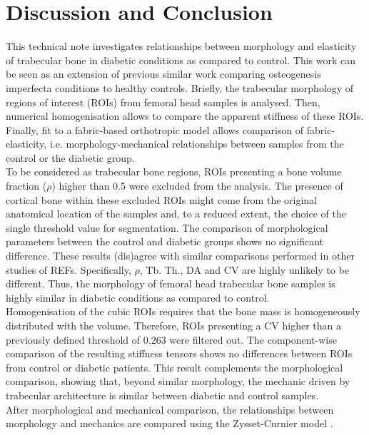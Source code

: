 \documentclass[a4paper,fleqn]{DC_ArtStyle}
\begin{document}
	
	\section{Discussion and Conclusion}
	This technical note investigates relationships between morphology and elasticity of trabecular bone in diabetic conditions as compared to control.
	This work can be seen as an extension of previous similar work \cite{Simon2022} comparing osteogenesis imperfecta conditions to healthy controls.
	Briefly, the trabecular morphology of regions of interest (ROIs) from femoral head samples is analysed.
	Then, numerical homogenisation allows to compare the apparent stiffness of these ROIs.
	Finally, fit to a fabric-based orthotropic model \cite{Zysset1995} allows comparison of fabric-elasticity, i.e. morphology-mechanical relationships between samples from the control or the diabetic group.
	\\[0.5em]
	To be considered as trabecular bone regions, ROIs presenting a bone volume fraction ($\rho$) higher than 0.5 were excluded from the analysis.
	The presence of cortical bone within these excluded ROIs might come from the original anatomical location of the samples and, to a reduced extent, the choice of the single threshold value for segmentation.
	The comparison of morphological parameters between the control and diabetic groups shows no significant difference.
	These results (dis)agree with similar comparisons performed in other studies of REFs.
	Specifically, $\rho$, Tb. Th., DA and CV are highly unlikely to be different.
	Thus, the morphology of femoral head trabecular bone samples is highly similar in diabetic conditions as compared to control.
	\\[0.5em]
	Homogenisation of the cubic ROIs requires that the bone mass is homogeneously distributed with the volume.
	Therefore, ROIs presenting a CV higher than a previously defined threshold of 0.263 \cite{Panyasantisuk2015} were filtered out.
	The component-wise comparison of the resulting stiffness tensors shows no differences between ROIs from control or diabetic patients.
	This result complements the morphological comparison, showing that, beyond similar morphology, the mechanic driven by trabecular architecture is similar between diabetic and control samples.
	\\[0.5em]
	After morphological and mechanical comparison, the relationships between morphology and mechanics are compared using the Zysset-Curnier model \cite{Zysset1995}.
\end{document}
